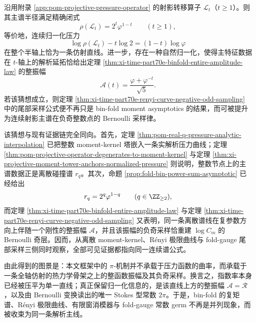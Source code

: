 \begin{conjecture}[连续射影谱的精确闭式与整振幅插值]\label{conj:xi-time-part70e-projective-pressure-entire-amplitude}
沿用附录 \ref{app:pom-projective-pressure-operator} 的射影转移算子 \(\mathcal L_t\)（\(t\ge 1\)）。则其主谱半径满足精确闭式
\[
\rho(\mathcal L_t)=2^t\varphi^{1-t}
\qquad (t\ge 1),
\]
等价地，连续归一化压力
\[
\log\rho(\mathcal L_t)-t\log 2=(1-t)\log\varphi
\]
在整个半轴上恰为一条仿射直线。进一步，存在一种自然归一化，使得主特征数据在 \(t\)-轴上的解析延拓恰给出定理 \ref{thm:xi-time-part70e-binfold-entire-amplitude-law} 的整振幅
\[
\mathcal A(t)=\frac{\varphi+\varphi^{-t}}{\sqrt5}.
\]
若该猜想成立，则定理 \ref{thm:xi-time-part70e-renyi-curve-negative-odd-sampling} 中的尾部采样公式便不再只是 bin-fold moment asymptotics 的结果，而可被提升为连续射影主谱在负奇整数点的 Bernoulli 采样律。
\end{conjecture}
\begin{remark}
该猜想与现有证据链完全同向。首先，定理 \ref{thm:pom-real-q-pressure-analytic-interpolation} 已把整数 moment-kernel 塔嵌入一条实解析压力曲线；定理 \ref{thm:pom-projective-operator-degenerates-to-moment-kernel} 与定理 \ref{thm:xi-projective-moment-tower-anchors-normalized-pressure} 则说明，整数节点上的主谱数据正是离散碰撞谱 \(r_q\)。其次，命题 \ref{prop:fold-bin-power-sum-asymptotic} 已经给出
\[
r_q=2^q\varphi^{1-q}
\qquad (q\in\ZZ_{\ge 2}),
\]
而定理 \ref{thm:xi-time-part70e-binfold-entire-amplitude-law} 与定理 \ref{thm:xi-time-part70e-renyi-curve-negative-odd-sampling} 又表明，同一条离散谱线在复参数方向上伴随一个刚性的整振幅 \(\mathcal A\)，并且该振幅的负奇采样恰重建 \(\log C_m\) 的 Bernoulli 奇层。因而，从离散 moment-kernel、Rényi 极限曲线与 fold-gauge 尾部采样三侧同时观察，全部可见证据都指向同一连续谱公式。
\end{remark}

\noindent
由此得到的图景是：本文框架中的 \(\pi\)-机制并不承载于压力函数的曲率，而承载于一条全轴仿射的热力学骨架之上的整函数振幅及其负奇采样。换言之，指数率本身已经被压平为单一直线；真正保留归一化信息的，是该直线上方的整振幅 \(\mathcal A=\mathcal R\)，以及由 Bernoulli 变换读出的唯一 Stokes 型常数 \(2\pi\)。于是，bin-fold 的复矩谱、Rényi 极限曲线、有限窗消模器与 fold-gauge 常数 germ 不再是并列现象，而被收束为同一条解析主线。

\endinput
